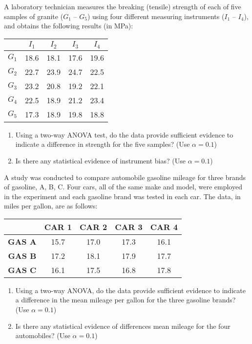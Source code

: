 \begin{problem}
A laboratory technician measures the breaking (tensile) strength of each of five
samples of granite ($G_1$ -- $G_5$) using four different measuring instruments ($I_1$ -- $I_4$),
and obtains the following results (in MPa):

\begin{table}[H]
\centering
\begin{tabular}{|c||c|c|c|c|} \hline
 & $I_1$ & $I_2$ & $I_3$ & $I_4$ \\ \hline
$G_1$ & 18.6 &  18.1 & 17.6  & 19.6 \\ \hline
$G_2$ & 22.7 &  23.9 & 24.7  & 22.5 \\ \hline
$G_3$ & 23.2 &  20.8 & 19.2  & 22.1 \\ \hline
$G_4$ & 22.5 &  18.9 & 21.2  & 23.4 \\ \hline
$G_5$ & 17.3 &  18.9 & 19.8  & 18.8 \\ \hline
\end{tabular}
\end{table}

\begin{enumerate}[label=\alph*)]
\item Using a two-way ANOVA test, do the data provide sufficient evidence to indicate a difference in strength for the five samples?
(Use $\alpha = 0.1$)
\item Is there any statistical evidence of instrument bias? (Use $\alpha = 0.1$)
\end{enumerate}
\end{problem}

\begin{problem}
A study was conducted to compare automobile gasoline mileage for three brands of gasoline,
A, B, C.  Four cars, all of the same make and model, were employed in the experiment and
each gasoline brand was tested in each car.  The data, in miles per gallon, are as follows:
\begin{table}[H]
\centering
\begin{tabular}{|c||c|c|c|c|} \hline
	&	\bf{CAR 1}	&	\bf{CAR 2}	&	\bf{CAR 3}	&	\bf{CAR 4} \\ \hline
\bf{GAS A}	&	15.7	&	17.0	&	17.3	&	16.1  \\ \hline
\bf{GAS B}	&	17.2	&	18.1	&	17.9	&	17.7  \\ \hline
\bf{GAS C}	&	16.1	&	17.5	&	16.8	&	17.8  \\ \hline
\end{tabular}
\end{table}

\begin{enumerate}[label=\alph*)]
\item Using a two-way ANOVA, do the data provide sufficient evidence to indicate a difference in the
	mean mileage per gallon for the three gasoline brands?
(Use $\alpha = 0.1$)
\item Is there any statistical evidence of differences mean mileage for the four automobiles? (Use $\alpha = 0.1$)
\end{enumerate}
\end{problem}

